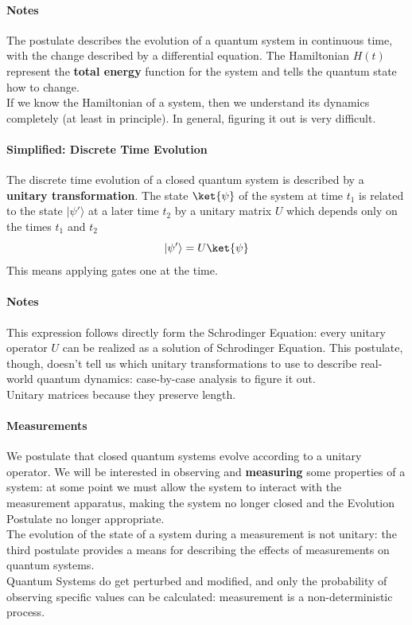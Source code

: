 \documentclass[10pt]{report}
\begin{document}
\paragraph{Notes} The postulate describes the evolution of a quantum system in continuous time, with the change described by a differential equation. The Hamiltonian $H(t)$ represent the \textbf{total energy} function for the system and tells the quantum state how to change.\\
If we know the Hamiltonian of a system, then we understand its dynamics completely (at least in principle). In general, figuring it out is very difficult.
\paragraph{Simplified: Discrete Time Evolution} The discrete time evolution of a closed quantum system is described by a \textbf{unitary transformation}. The state $\ket{\psi}$ of the system at time $t_1$ is related to the state $|\psi'\rangle$ at a later time $t_2$ by a unitary matrix $U$ which depends only on the times $t_1$ and $t_2$ $$|\psi'\rangle = U\ket{\psi}$$
This means applying gates one at the time.
\paragraph{Notes} This expression follows directly form the Schrodinger Equation: every unitary operator $U$ can be realized as a solution of Schrodinger Equation. This postulate, though, doesn't tell us which unitary transformations to use to describe real-world quantum dynamics: case-by-case analysis to figure it out.\\
Unitary matrices because they preserve length.
\paragraph{Measurements} We postulate that closed quantum systems evolve according to a unitary operator. We will be interested in observing and \textbf{measuring} some properties of a system: at some point we must allow the system to interact with the measurement apparatus, making the system no longer closed and the Evolution Postulate no longer appropriate.\\
The evolution of the state of a system during a measurement is not unitary: the third postulate provides a means for describing the effects of measurements on quantum systems.\\
Quantum Systems do get perturbed and modified, and only the probability of observing specific values can be calculated: measurement is a non-deterministic process.
\end{document}
